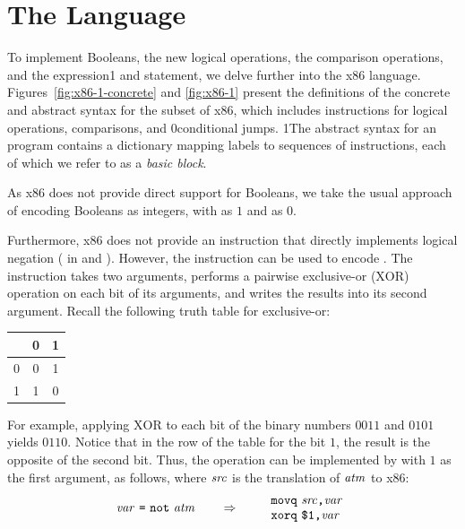 \documentclass[7x10]{TimesAPriori_MIT}%
\def\racketEd{0}
\def\pythonEd{1}
\def\edition{1}
\newcommand{\racket}[1]{{\if\edition\racketEd{#1}\fi}}
\newcommand{\pythonColor}[0]{}
\newcommand{\python}[1]{{\if\edition\pythonEd\pythonColor #1\fi}}
\numberwithin{theorem}{chapter}
\numberwithin{definition}{chapter}
\numberwithin{equation}{chapter}
\begin{document}
\section{The \LangXIf{} Language}
\label{sec:x86-if}

To implement Booleans, the new logical operations, the
comparison operations, and the  expression\python{ and
  statement}, we delve further into the x86
language. Figures~\ref{fig:x86-1-concrete} and \ref{fig:x86-1} present
the definitions of the concrete and abstract syntax for the \LangXIf{}
subset of x86, which includes instructions for logical operations,
comparisons, and \racket{conditional} jumps.
%
\python{The abstract syntax for an \LangXIf{} program contains a
  dictionary mapping labels to sequences of instructions, each of
  which we refer to as a \emph{basic block}\index{subject}{basic
    block}.}

As x86 does not provide direct support for Booleans, we take the usual
approach of encoding Booleans as integers, with  as $1$ and
 as $0$.

Furthermore, x86 does not provide an instruction that directly
implements logical negation ( in \LangIf{} and \LangCIf{}).
However, the  instruction can be used to encode .
The  instruction takes two arguments, performs a pairwise
exclusive-or ($\mathrm{XOR}$) operation on each bit of its arguments,
and writes the results into its second argument.  Recall the following
truth table for exclusive-or:
\begin{center}
\begin{tabular}{l|cc}
   & 0 & 1 \\ \hline
0  & 0 & 1 \\
1  & 1 & 0
\end{tabular}
\end{center}
For example, applying $\mathrm{XOR}$ to each bit of the binary numbers
$0011$ and $0101$ yields $0110$. Notice that in the row of the table
for the bit $1$, the result is the opposite of the second bit.  Thus,
the  operation can be implemented by  with $1$ as
the first argument, as follows, where $\mathit{src}$ is the translation of
$\mathit{atm}$ to x86:
\[
\mathit{var}~\texttt{=}~\texttt{not}~\mathit{atm}
\qquad\Rightarrow\qquad
\begin{array}{l}
\texttt{movq}~ \mathit{src}\texttt{,} \mathit{var}\\
\texttt{xorq}~ \texttt{\$1,} \mathit{var}
\end{array}
\]
\end{document}
